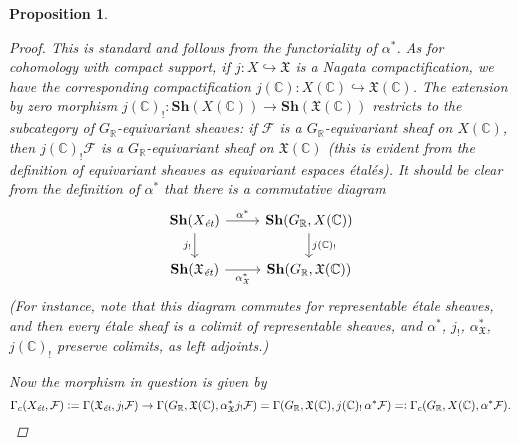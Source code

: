 \documentclass{article}
\DeclareMathOperator{\Hom}{Hom}
\newcommand{\CC}{\mathbb{C}}
\newcommand{\RR}{\mathbb{R}}
\newcommand{\ZZ}{\mathbb{Z}}
\newcommand{\et}{\text{\it ét}}
\newcommand{\dfn}{\mathrel{\mathop:}=}
\newcommand{\rdfn}{=\mathrel{\mathop:}}
\newtheorem{proposition}[theorem]{Proposition}
\theoremstyle{definition}
\numberwithin{equation}{section}
\begin{document}
\begin{appendices}
\begin{proposition}
  \begin{proof}
    This is standard and follows from the functoriality of $\alpha^*$.
    As for cohomology with compact support, if
    $j\colon X \hookrightarrow \mathfrak{X}$ is a Nagata compactification,
    we have the corresponding compactification
    $j (\CC)\colon X (\CC) \hookrightarrow \mathfrak{X} (\CC)$. The extension by
    zero morphism
    $j (\CC)_!\colon \mathbf{Sh} (X (\CC)) \to \mathbf{Sh} (\mathfrak{X} (\CC))$
    restricts to the subcategory of $G_\RR$-equivariant sheaves:
    if $\mathcal{F}$ is a $G_\RR$-equivariant sheaf on $X (\CC)$, then
    $j (\CC)_!  \mathcal{F}$ is a $G_\RR$-equivariant sheaf on
    $\mathfrak{X} (\CC)$ (this is evident from the definition of equivariant
    sheaves as equivariant espaces étalés). It should be clear from the
    definition of $\alpha^*$ that there is a commutative diagram
    \[ \begin{tikzcd}
      \mathbf{Sh} (X_\et) \ar{r}{\alpha^*}\ar{d}[swap]{j_!} & \mathbf{Sh} (G_\RR, X (\CC)) \ar{d}{j (\CC)_!} \\
      \mathbf{Sh} (\mathfrak{X}_\et) \ar{r}[swap]{\alpha^*_\mathfrak{X}} & \mathbf{Sh} (G_\RR, \mathfrak{X} (\CC))
    \end{tikzcd} \]
    (For instance, note that this diagram commutes for representable étale
    sheaves, and then every étale sheaf is a colimit of representable sheaves,
    and $\alpha^*$, $j_!$, $\alpha^*_\mathfrak{X}$, $j (\CC)_!$ preserve
    colimits, as left adjoints.)

    Now the morphism in question is given by
    \[ \Gamma_c (X_\et, \mathcal{F}) \dfn \Gamma (\mathfrak{X}_\et, j_! \mathcal{F}) \to
    \Gamma (G_\RR, \mathfrak{X} (\CC), \alpha^*_\mathfrak{X} j_! \mathcal{F}) =
    \Gamma (G_\RR, \mathfrak{X} (\CC), j (\CC)_! \, \alpha^* \mathcal{F})
    \rdfn \Gamma_c (G_\RR, X (\CC), \alpha^* \mathcal{F}). \qedhere \]
  \end{proof}
\end{proposition}


\end{appendices}
\end{document}
